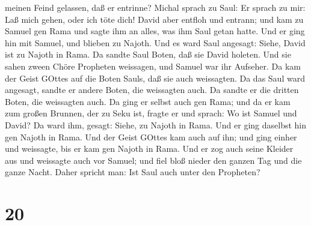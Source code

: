 meinen Feind gelassen, daß er entrinne? Michal sprach zu Saul: Er sprach
zu mir: Laß mich gehen, oder ich töte dich!  David aber
entfloh und entrann; und kam zu Samuel gen Rama und sagte ihm an alles,
was ihm Saul getan hatte. Und er ging hin mit Samuel, und blieben zu
Najoth.  Und es ward Saul angesagt: Siehe, David ist zu
Najoth in Rama.  Da sandte Saul Boten, daß sie David
holeten. Und sie sahen zween Chöre Propheten weissagen, und Samuel war
ihr Aufseher. Da kam der Geist GOttes auf die Boten Sauls, daß sie auch
weissagten.  Da das Saul ward angesagt, sandte er andere
Boten, die weissagten auch. Da sandte er die dritten Boten, die
weissagten auch.  Da ging er selbst auch gen Rama; und da
er kam zum großen Brunnen, der zu Seku ist, fragte er und sprach: Wo ist
Samuel und David? Da ward ihm, gesagt: Siehe, zu Najoth in Rama.
 Und er ging daselbst hin gen Najoth in Rama. Und der Geist
GOttes kam auch auf ihn; und ging einher und weissagte, bis er kam gen
Najoth in Rama.  Und er zog auch seine Kleider aus und
weissagte auch vor Samuel; und fiel bloß nieder den ganzen Tag und die
ganze Nacht. Daher spricht man: Ist Saul auch unter den Propheten?

\hypertarget{section-19}{%
\section{20}\label{section-19}}

